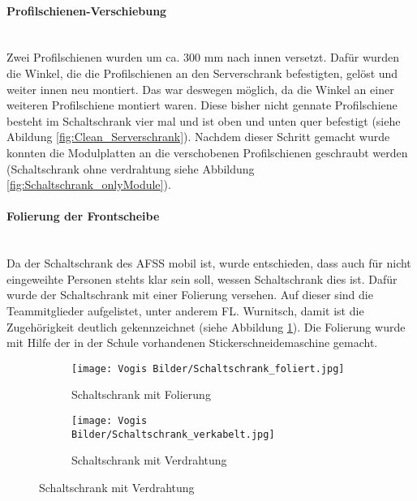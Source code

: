     \paragraph{Profilschienen-Verschiebung}\mbox{}\\
    Zwei Profilschienen wurden um ca. 300 mm nach innen versetzt. Dafür wurden die Winkel, die die Profilschienen an den Serverschrank befestigten, gelöst und weiter innen neu montiert. Das war deswegen möglich, da die Winkel an einer weiteren Profilschiene montiert waren. Diese bisher nicht gennate Profilschiene besteht im Schaltschrank vier mal und ist oben und unten quer befestigt (siehe Abildung \ref{fig:Clean_Serverschrank}). Nachdem dieser Schritt gemacht wurde konnten die Modulplatten an die verschobenen Profilschienen geschraubt werden (Schaltschrank ohne verdrahtung siehe Abbildung \ref{fig:Schaltschrank_onlyModule}).  
    \paragraph{Folierung der Frontscheibe}\mbox{}\\
    Da der Schaltschrank des AFSS mobil ist, wurde entschieden, dass auch für nicht eingeweihte Personen stehts klar sein soll, wessen Schaltschrank dies ist. Dafür wurde der Schaltschrank mit einer Folierung versehen. Auf dieser sind die Teammitglieder aufgelistet, unter anderem FL. Wurnitsch, damit ist die Zugehörigkeit deutlich gekennzeichnet (siehe Abbildung \ref{fig:Schaltschrank_foliert}). Die Folierung wurde mit Hilfe der in der Schule vorhandenen Stickerschneidemaschine gemacht.
    \begin{figure}[h]
        \centering
        \begin{subfigure}{0.45\textwidth}
            \centering
            \texttt{[image: Vogis Bilder/Schaltschrank\_foliert.jpg]}
            \caption{Schaltschrank mit Folierung}
            \label{fig:Schaltschrank_foliert}
        \end{subfigure}
        \hfill
        \begin{subfigure}{0.4\textwidth}
            \centering
            \texttt{[image: Vogis Bilder/Schaltschrank\_verkabelt.jpg]}
            \caption{Schaltschrank mit Verdrahtung}
            \label{fig:Schaltschrank_verkabelt}
        \end{subfigure}
    \end{figure}
